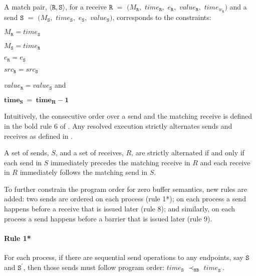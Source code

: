 \begin{definition} \label{def:match*}
A match pair, $\langle\mathtt{R}, \mathtt{S}\rangle$, for a receive
$\mathtt{R}$ $=$ $(M_\mathtt{R},$ $\mathit{time}_\mathtt{R},$ $e_\mathtt{R},$ $\mathit{value}_\mathtt{R},$ $\mathit{time}_{\mathit{w}_\mathtt{R}})$ and a send $\mathtt{S}$ $=$ $(M_\mathtt{S},$ $\mathit{time}_\mathtt{S},$ $e_\mathtt{S},$ $\mathit{value}_\mathtt{S})$, corresponds to the constraints:
\begin{compactenum}
\item $M_{\mathtt{R}} = \mathit{time}_{\mathtt{S}}$
\item $M_{\mathtt{S}} = \mathit{time}_{\mathtt{R}}$
\item $e_{\mathtt{R}} = e_{\mathtt{S}}$
\item $src_\mathtt{R} = src_\mathtt{S}$
\item $\mathit{value}_{\mathtt{R}} = \mathit{value}_{\mathtt{S}}$ and
\item $\mathit{\textbf{time}}_{\mathtt{\textbf{S}}}\ = \ \mathit{\textbf{time}}_{\mathtt{\textbf{R}}} - \mathit{\textbf{1}}$
\end{compactenum}
\end{definition}

Intuitively, the consecutive order over a send and the matching receive is defined in the bold rule $6$ of . Any resolved execution strictly alternates sends and receives as defined in . 

\begin{definition}\label{def:alternate}
A set of sends, $S$, and a set of receives, $R$, are strictly alternated if and only if each send in $S$ immediately precedes the matching receive in $R$ and each receive in $R$ immediately follows the matching send in $S$.
\end{definition}

To further constrain the program order for zero buffer semantics, new rules are added: two sends are ordered on each process (rule 1*); on each process a send happens before a receive that is issued later (rule 8); and similarly, on each process a send happens before a barrier that is issued later (rule 9).

\paragraph*{Rule 1*} For each process, if there are sequential send
operations to any endpoints, say $\mathtt{S}$ and $\mathtt{S^\prime}$, then those
sends must follow program order: $\mathit{time}_\mathtt{S}$
$\prec_\mathtt{HB}$ $\mathit{time}_\mathtt{S^\prime}$.

